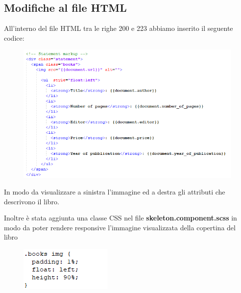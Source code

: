 \documentclass[a4paper,11pt]{report}
\begin{document}
\subsection{Modifiche al file HTML}
All'interno del file HTML tra le righe 200 e 223 abbiamo inserito il seguente codice: \\
\begin{figure}[h]
	\centering
	\includegraphics[width=0.9\linewidth]{statement}
	\label{fig:statement}
\end{figure}
In modo da visualizzare a sinistra l'immagine ed a destra gli attributi che descrivono il libro.

Inoltre è stata aggiunta una classe CSS nel file \textbf{skeleton.component.scss} in modo da poter rendere responsive l'immagine visualizzata della copertina del libro
\begin{figure}[h]
	\includegraphics[width=0.3\linewidth]{css}
	\label{fig:css}
\end{figure}
\end{document}
